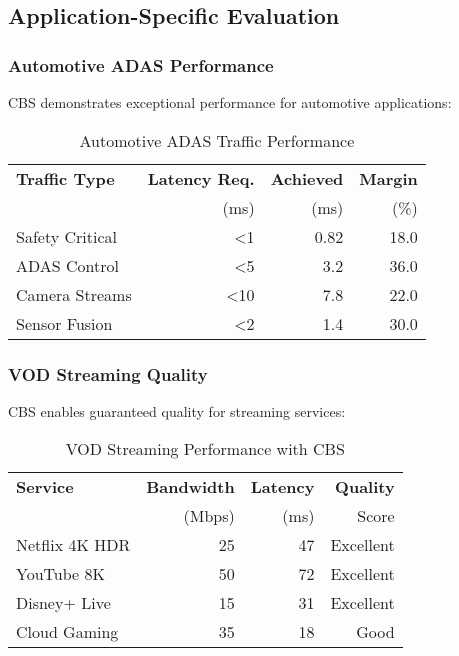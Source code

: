 \documentclass[10pt, journal, compsoc]{IEEEtran}
\begin{document}
\subsection{Application-Specific Evaluation}

\subsubsection{Automotive ADAS Performance}

CBS demonstrates exceptional performance for automotive applications:

\begin{table}[h]
\centering
\caption{Automotive ADAS Traffic Performance}
\label{tab:automotive_performance}
\begin{tabular}{lrrr}
\toprule
\textbf{Traffic Type} & \textbf{Latency Req.} & \textbf{Achieved} & \textbf{Margin} \\
& (ms) & (ms) & (\%) \\
\midrule
Safety Critical & <1 & 0.82 & 18.0 \\
ADAS Control & <5 & 3.2 & 36.0 \\
Camera Streams & <10 & 7.8 & 22.0 \\
Sensor Fusion & <2 & 1.4 & 30.0 \\
\bottomrule
\end{tabular}
\end{table}

\subsubsection{VOD Streaming Quality}

CBS enables guaranteed quality for streaming services:

\begin{table}[h]
\centering
\caption{VOD Streaming Performance with CBS}
\label{tab:streaming_performance}
\begin{tabular}{lrrr}
\toprule
\textbf{Service} & \textbf{Bandwidth} & \textbf{Latency} & \textbf{Quality} \\
& (Mbps) & (ms) & Score \\
\midrule
Netflix 4K HDR & 25 & 47 & Excellent \\
YouTube 8K & 50 & 72 & Excellent \\
Disney+ Live & 15 & 31 & Excellent \\
Cloud Gaming & 35 & 18 & Good \\
\bottomrule
\end{tabular}
\end{table}
\end{document}
